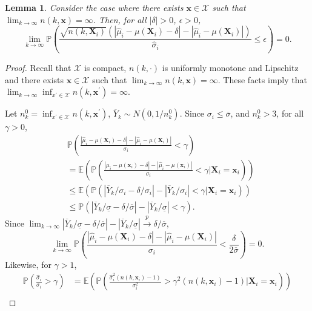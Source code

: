 \documentclass[12pt]{article}
\newcommand{\spa}[1]{\text{{$\mathcal{#1}$}}}
\newcommand{\des}{\ensuremath{\bm{x}}}
\newcommand{\vect}[1]{\ensuremath{\bm{#1}}}
\newcommand{\desCap}{\ensuremath{\bm{X}}}
\newtheorem{lemma}{Lemma}
\begin{document}
\begin{lemma}
\label{lemma:infNProb}
    Consider the case where there exists $\vect{x} \in \spa{X}$ such that $\lim_{k \to \infty}n(k,\vect{x}) =\infty$. Then, for all $|\delta|>0$, $\epsilon>0$,
    $$\lim_{k \to \infty} \mathbb{P}\left ( \frac{\sqrt{n(k,\desCap_i)}(|\hat{\mu}_i-\mu(\desCap_i)-\delta|-|\hat{\mu}_i-\mu(\desCap_i)|)}{\hat{\sigma}_i}\leq \epsilon \right )=0.$$
\end{lemma}
\begin{proof}
    Recall that $\spa{X}$ is compact, $n(k,\cdot)$ is uniformly monotone and Lipschitz and there exists $\vect{x} \in \spa{X}$ such that $\lim_{k \to \infty}n(k,\vect{x}) =\infty$. These facts imply that $\lim_{k \to \infty}\inf_{x^\prime \in \spa{X}}n(k,\vect{x}^\prime)=\infty$. 

    Let $n^0_k=\inf_{x^\prime \in \spa{X}}n(k,\vect{x}^\prime)$, $\overline{Y}_k\sim N(0,1/n^0_k)$. Since $\sigma_i \leq \overline{\sigma}$, and $n^0_k>3$, for all $\gamma>0$,
    \begin{equation*}
        \begin{split}
         &\mathbb{P}\left ( \frac{|\hat{\mu}_i-\mu(\desCap_i)-\delta|-|\hat{\mu}_i-\mu(\desCap_i)|}{\sigma_i} <\gamma \right )\\
         &=\mathbb{E}\left (\mathbb{P}\left ( \frac{|\hat{\mu}_i-\mu(\des_i)-\delta|-|\hat{\mu}_i-\mu(\des_i)|}{\sigma_i} <\gamma \Big\vert \desCap_i=\des_i \right ) \right )\\
         &\leq \mathbb{E}\left (\mathbb{P}\left ( |\overline{Y}_k/\sigma_i-\delta/\sigma_i|-|\overline{Y}_k/\sigma_i| <\gamma \Big\vert \desCap_i=\des_i \right ) \right )\\
         &\leq \mathbb{P}\left ( |\overline{Y}_k/\underline{\sigma}-\delta/\overline{\sigma}|-|\overline{Y}_k/\underline{\sigma}| <\gamma \right ).
        \end{split}
    \end{equation*}
    Since $\lim_{k \to \infty} |\overline{Y}_k/\underline{\sigma}-\delta/\overline{\sigma}|-|\overline{Y}_k/\underline{\sigma}|\overset{p}{\to} \delta/\overline{\sigma}$,
    $$\lim_{k \to \infty}\mathbb{P}\left ( \frac{|\hat{\mu}_i-\mu(\desCap_i)-\delta|-|\hat{\mu}_i-\mu(\desCap_i)|}{\sigma_i} <\frac{\delta}{2\overline{\sigma}} \right )=0.$$
    Likewise, for $\gamma>1$,
    \begin{equation*}
        \begin{split}
          \mathbb{P}\left ( \frac{\hat{\sigma}_i}{\sigma_i}>\gamma\right )&=\mathbb{E}\left (\mathbb{P}\left ( \frac{\hat{\sigma}^2_i(n(k,\des_i)-1)}{\sigma^2_i}>\gamma^2(n(k,\des_i)-1)\Big\vert \desCap_i=\des_i\right ) \right ) \\

\end{split}
\end{equation*}
\end{proof}
\end{document}
